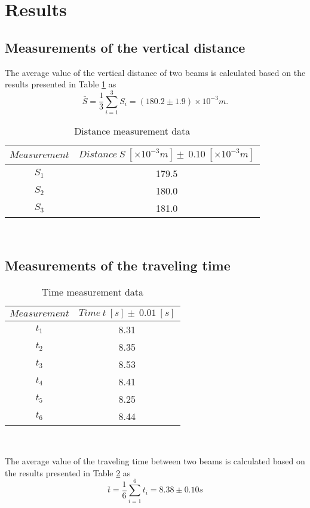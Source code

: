 \section{Results}
\subsection{Measurements of the vertical distance}
    The average value of the vertical distance of two beams is calculated  based on the results presented in Table \ref{distance} as
    \[
        \bar{S}=\frac{1}{3}\sum_{i=1}^{3}S_i=(180.2\pm 1.9)\times10^{-3}m.
    \]
    \begin{table}[h]
        \centering
        \begin{tabular}{cc}
            \hline
            $Measurement$ & $Distance\ S\ [\times10^{-3}m] \pm\ 0.10\ [\times10^{-3}m]$\\
            \hline
            $S_1$ & 179.5\\
            $S_2$ & 180.0\\
            $S_3$ & 181.0\\     
            \hline
        \end{tabular}\\
        \caption{Distance measurement data}
        \label{distance}
    \end{table}

\subsection{Measurements of the traveling time}
    \begin{table}[htbp]
        \centering
        \begin{tabular}{cc}
            \hline
            $Measurement$ & $Time\ t\ [s] \pm\ 0.01\ [s]$\\
            \hline
            $t_1$ & 8.31\\
            $t_2$ & 8.35\\
            $t_3$ & 8.53\\
            $t_4$ & 8.41\\
            $t_5$ & 8.25\\
            $t_6$ & 8.44\\
            \hline
        \end{tabular}\\
        \caption{Time measurement data}
        \label{time}
    \end{table}
    The average value of the traveling time between two beams is calculated  based on the results presented in Table \ref{time} as
    \[
        \bar{t}=\frac{1}{6}\sum_{i=1}^{6}t_i=8.38\pm 0.10s
    \]

